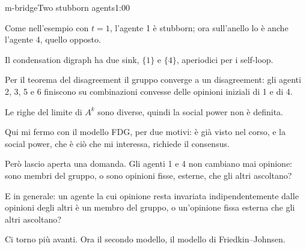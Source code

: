 \begin{slide}{m-bridge}{Two stubborn agents}{1:00}
  \begin{discorso}
    \item Come {\color{red}  } {\color{blue}nell'esempio} con $t=1$, l'agente 1 è stubborn; ora sull'anello lo è anche l'agente 4, quello opposto.
    \item Il condensation digraph ha due sink, $\{1\}$ e $\{4\}$, aperiodici per i self-loop.
    \item Per il {\color{red} } {\color{blue}teorema del disagreement} il gruppo converge a un {\color{red}} {\color{blue}disagreement:} gli agenti 2, 3, 5 e 6 finiscono su combinazioni convesse delle opinioni iniziali di 1 e di 4.
    \item Le righe del limite di $A^k$ sono diverse, quindi la social power non è definita.
    \item Qui mi fermo con il modello FDG, per due motivi: è già visto nel corso, e la social power, che è ciò che mi interessa, richiede il {\color{red}} {\color{blue}consensus.}
    \item Però lascio aperta una domanda. Gli agenti 1 e 4 non cambiano mai opinione: sono membri del gruppo, o sono opinioni fisse, esterne, che gli altri ascoltano?
    \item E in generale: un agente la cui opinione resta invariata indipendentemente dalle opinioni degli altri è un membro del gruppo, o un'opinione fissa esterna che gli altri ascoltano?
    \item Ci torno più avanti. Ora il secondo modello, il modello di Friedkin–Johnsen.
  \end{discorso}
\end{slide}


